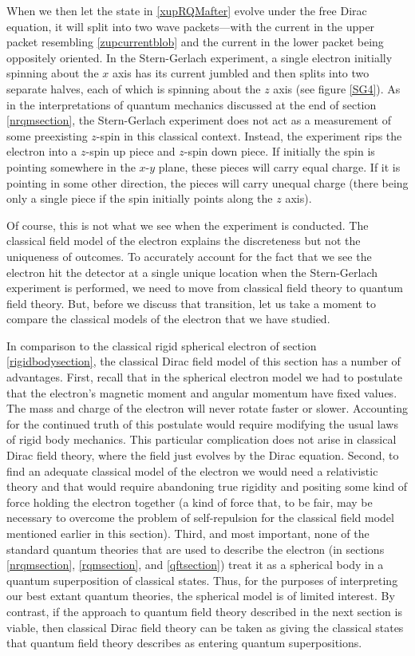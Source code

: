\documentclass[onecolumn,secnumarabic,amsmath,amssymb,balancelastpage,nofootinbib]{article}
\begin{document}
When we then let the state in \eqref{xupRQMafter} evolve under the free Dirac equation, it will split into two wave packets---with the current in the upper packet resembling \eqref{zupcurrentblob} and the current in the lower packet being oppositely oriented.  In the Stern-Gerlach experiment, a single electron initially spinning about the $x$ axis has its current jumbled and then splits into two separate halves, each of which is spinning about the $z$ axis (see figure \ref{SG4}).  As in the interpretations of quantum mechanics discussed at the end of section \ref{nrqmsection}, the Stern-Gerlach experiment does not act as a measurement of some preexisting $z$-spin in this classical context.  Instead, the experiment rips the electron into a $z$-spin up piece and $z$-spin down piece.  If initially the spin is pointing somewhere in the $x$-$y$ plane, these pieces will carry equal charge.  If it is pointing in some other direction, the pieces will carry unequal charge (there being only a single piece if the spin initially points along the $z$ axis).

Of course, this is not what we see when the experiment is conducted.  The classical field model of the electron explains the discreteness but not the uniqueness of outcomes.  To accurately account for the fact that we see the electron hit the detector at a single unique location when the Stern-Gerlach experiment is performed, we need to move from classical field theory to quantum field theory.  But, before we discuss that transition, let us take a moment to compare the classical models of the electron that we have studied.

In comparison to the classical rigid spherical electron of section \ref{rigidbodysection}, the classical Dirac field model of this section has a number of advantages.  First, recall that in the spherical electron model we had to postulate that the electron's magnetic moment and angular momentum have fixed values.  The mass and charge of the electron will never rotate faster or slower.  Accounting for the continued truth of this postulate would require modifying the usual laws of rigid body mechanics.  This particular complication does not arise in classical Dirac field theory, where the field just evolves by the Dirac equation.  Second, to find an adequate classical model of the electron we would need a relativistic theory and that would require abandoning true rigidity and positing some kind of force holding the electron together (a kind of force that, to be fair, may be necessary to overcome the problem of self-repulsion for the classical field model mentioned earlier in this section).  Third, and most important, none of the standard quantum theories that are used to describe the electron (in sections \ref{nrqmsection}, \ref{rqmsection}, and \ref{qftsection}) treat it as a spherical body in a quantum superposition of classical states.  Thus, for the purposes of interpreting our best extant quantum theories, the spherical model is of limited interest.  By contrast, if the approach to quantum field theory described in the next section is viable, then classical Dirac field theory can be taken as giving the classical states that quantum field theory describes as entering quantum superpositions.
\end{document}
